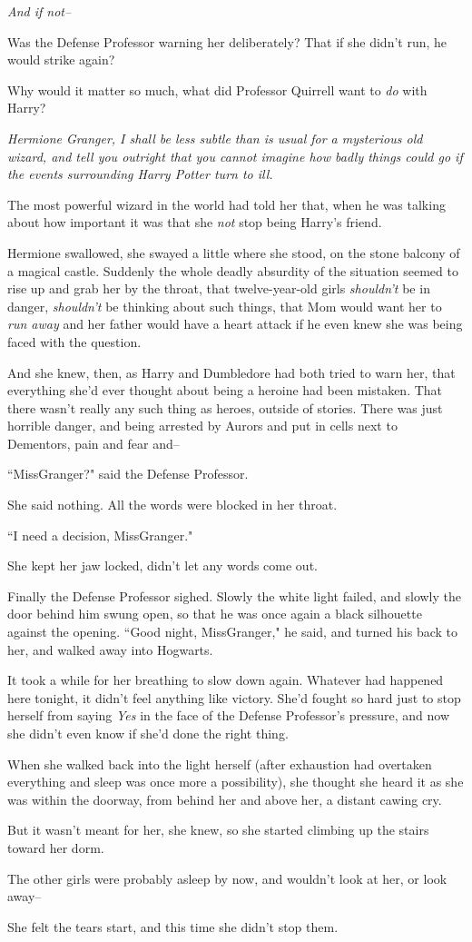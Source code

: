 \emph{And if not\---}

Was the Defense Professor warning her deliberately? That if she didn't run, he would strike again?

Why would it matter so much, what did Professor Quirrell want to \emph{do} with Harry?

\emph{Hermione Granger, I shall be less subtle than is usual for a mysterious old wizard, and tell you outright that you cannot \emph{imagine} how badly things could go if the events surrounding Harry Potter turn to ill.}

The most powerful wizard in the world had told her that, when he was talking about how important it was that she \emph{not} stop being Harry's friend.

Hermione swallowed, she swayed a little where she stood, on the stone balcony of a magical castle. Suddenly the whole deadly absurdity of the situation seemed to rise up and grab her by the throat, that twelve-year-old girls \emph{shouldn't} be in danger, \emph{shouldn't} be thinking about such things, that Mom would want her to \emph{run away} and her father would have a heart attack if he even knew she was being faced with the question.

And she knew, then, as Harry and Dumbledore had both tried to warn her, that everything she'd ever thought about being a heroine had been mistaken. That there wasn't really any such thing as heroes, outside of stories. There was just horrible danger, and being arrested by Aurors and put in cells next to Dementors, pain and fear and\---

``Miss\?Granger?" said the Defense Professor.

She said nothing. All the words were blocked in her throat.

``I need a decision, Miss\?Granger."

She kept her jaw locked, didn't let any words come out.

Finally the Defense Professor sighed. Slowly the white light failed, and slowly the door behind him swung open, so that he was once again a black silhouette against the opening. ``Good night, Miss\?Granger," he said, and turned his back to her, and walked away into Hogwarts.

It took a while for her breathing to slow down again. Whatever had happened here tonight, it didn't feel anything like victory. She'd fought so hard just to stop herself from saying \emph{Yes} in the face of the Defense Professor's pressure, and now she didn't even know if she'd done the right thing.

When she walked back into the light herself (after exhaustion had overtaken everything and sleep was once more a possibility), she thought she heard it as she was within the doorway, from behind her and above her, a distant cawing cry.

But it wasn't meant for her, she knew, so she started climbing up the stairs toward her dorm.

The other girls were probably asleep by now, and wouldn't look at her, or look away\---

She felt the tears start, and this time she didn't stop them.

